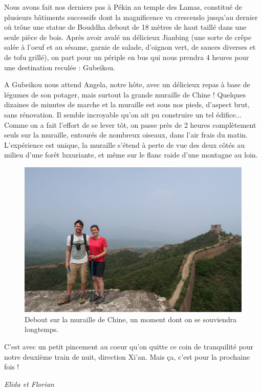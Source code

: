 Nous avons fait nos derniers pas à Pékin au temple des Lamas, constitué
de plusieurs bâtiments successifs dont la magnificence va crescendo
jusqu'au dernier où trône une statue de Bouddha debout de 18 mètres de
haut taillé dans une seule pièce de bois. Après avoir avalé un délicieux
Jianbing (une sorte de crêpe salée à l'oeuf et au sésame, garnie de
salade, d'oignon vert, de sauces diverses et de tofu grillé), on part
pour un périple en bus qui nous prendra 4 heures pour une destination
reculée : Gubeikou.

A Gubeikou nous attend Angela, notre hôte, avec un délicieux repas à
base de légumes de son potager, mais surtout la grande muraille de Chine
! Quelques dizaines de minutes de marche et la muraille est sous nos
pieds, d'aspect brut, sans rénovation. Il semble incroyable qu'on ait pu
construire un tel édifice... Comme on a fait l'effort de se lever tôt,
on passe près de 2 heures complètement seuls sur la muraille, entourés
de nombreux oiseaux, dans l'air frais du matin. L'expérience est unique,
la muraille s'étend à perte de vue des deux côtés au milieu d'une forêt
luxuriante, et même sur le flanc raide d'une montagne au loin.

\begin{figure}
\centering
\includegraphics{images/20180616_muraille.JPG}
\caption{Debout sur la muraille de Chine, un moment dont on se
souviendra longtemps.}
\end{figure}

C'est avec un petit pincement au coeur qu'on quitte ce coin de
tranquilité pour notre deuxième train de nuit, direction Xi'an. Mais ça,
c'est pour la prochaine fois !

\emph{Elida et Florian}

